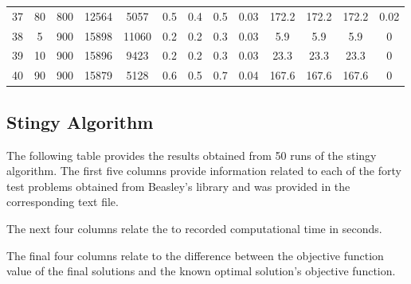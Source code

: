 \documentclass[11pt]{article}
\begin{document}
\begin{appendices}
\begin{landscape}
\begin{longtable}[c]{ccccc|cccc|cccc}
				37 & 80  & 800 & 12564 & 5057  & 0.5 & 0.4 & 0.5 & 0.03 & 172.2 & 172.2 & 172.2 & 0.02 \\
				\rowcolor[HTML]{EFEFEF} 
				38 & 5   & 900 & 15898 & 11060 & 0.2 & 0.2 & 0.3 & 0.03 & 5.9   & 5.9   & 5.9   & 0    \\
				\rowcolor[HTML]{EFEFEF} 
				39 & 10  & 900 & 15896 & 9423  & 0.2 & 0.2 & 0.3 & 0.03 & 23.3  & 23.3  & 23.3  & 0    \\
				\rowcolor[HTML]{EFEFEF} 
				40 & 90  & 900 & 15879 & 5128  & 0.6 & 0.5 & 0.7 & 0.04 & 167.6 & 167.6 & 167.6 & 0   
			\end{longtable}
		\end{landscape}
		
		\subsection{Stingy Algorithm}
		
		The following table provides the results obtained from 50 runs of the stingy algorithm.  The first five columns provide information related to each of the forty test problems obtained from Beasley's library \cite{BEAS90} and was provided in the corresponding text file.
		
		The next four columns relate the to recorded computational time in seconds.
		
		The final four columns relate to the difference between the objective function value of the final solutions and the known optimal solution's objective function.
		

\end{appendices}
\end{document}
